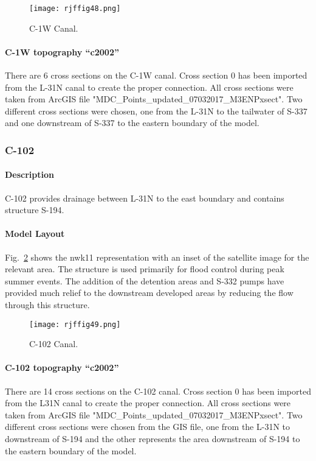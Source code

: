 \begin{figure}[!h]
  \begin{center}
  \texttt{[image: rjffig48.png]}
  \caption{C-1W Canal.}
  \label{fig:rjffig48}
  \end{center}
\end{figure}

\paragraph{C-1W topography ``c2002''}
There are 6 cross sections on the C-1W canal.  Cross section 0 has been imported from the L-31N canal to create the proper connection.  All cross sections were taken from ArcGIS file "MDC\_Points\_updated\_07032017\_M3ENPxsect".  Two different cross sections were chosen, one from the L-31N to the tailwater of S-337 and one downstream of S-337 to the eastern boundary of the model.


\clearpage
\subsubsection{C-102}
\paragraph{Description}
C-102 provides drainage between L-31N to the east boundary and contains structure S-194.

\paragraph{Model Layout}
Fig.~\ref{fig:rjffig49} shows the nwk11 representation with an inset of the satellite image for the relevant area. The structure is used primarily for flood control during peak summer events. The addition of the detention areas and S-332 pumps have provided much relief to the downstream developed areas by reducing the  flow through this structure.

\begin{figure}[!h]
  \begin{center}
  \texttt{[image: rjffig49.png]}
  \caption{C-102 Canal.}
  \label{fig:rjffig49}
  \end{center}
\end{figure}


\paragraph{C-102 topography ``c2002''}
There are 14 cross sections on the C-102 canal.  Cross section 0 has been imported from the L31N canal to create the proper connection.  All cross sections were taken from ArcGIS file "MDC\_Points\_updated\_07032017\_M3ENPxsect".  Two different cross sections were chosen from the GIS file, one from the L-31N to downstream of S-194 and the other represents the area downstream of S-194 to the eastern boundary of the model.


